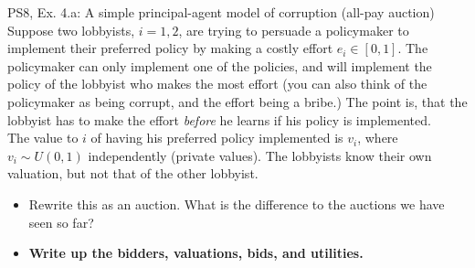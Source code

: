 \begin{frame}{PS8, Ex. 4.a: A simple principal-agent model of corruption (all-pay auction)}
    Suppose two lobbyists, $i = 1, 2$, are trying to persuade a policymaker to implement their preferred policy by making a costly effort $e_i\in[0, 1]$. The policymaker can only implement one of the policies, and will implement the policy of the lobbyist who makes the most effort (you can also think of the policymaker as being corrupt, and the effort being a bribe.) The point is, that the lobbyist has to make the effort \textit{before} he learns if his policy is implemented.\\\medskip
    The value to $i$ of having his preferred policy implemented is $v_i$, where $v_i\sim U(0, 1)$ independently (private values). The lobbyists know their own valuation, but not that of the other lobbyist.
    \begin{itemize}
      \item[(a)] Rewrite this as an auction. What is the difference to the auctions we have seen so far?
    \end{itemize}
    \vspace{-8pt}
    \begin{multicols}{2}
      \begin{itemize}
        \item[Step 1:] \textbf{Write up the bidders, valuations, bids, and utilities.}
      \end{itemize}
      \vfill\null\columnbreak
      \vfill\null
    \end{multicols}
\end{frame}

